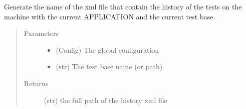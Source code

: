 \documentclass[a4paper,10pt,english]{sphinxmanual}
\begin{document}
\begin{fulllineitems}
\label{\detokenize{apidoc_commands/commands:commands.test.generate_history_xml_path}}
Generate the name of the xml file that contain the history of the tests
on the machine with the current APPLICATION and the current test base.
\begin{quote}\begin{description}
\item[{Parameters}] \leavevmode\begin{itemize}
\item {} 
 \textendash{} (Config) The global configuration

\item {} 
 \textendash{} (str) The test base name (or path)

\end{itemize}

\item[{Returns}] \leavevmode
(str) the full path of the history xml file

\end{description}\end{quote}

\end{fulllineitems}


\begin{fulllineitems}
\label{\detokenize{apidoc_commands/commands:commands.test.move_test_results}}
\end{fulllineitems}


\begin{fulllineitems}
\label{\detokenize{apidoc_commands/commands:commands.test.save_file}}
\end{fulllineitems}
\end{document}
